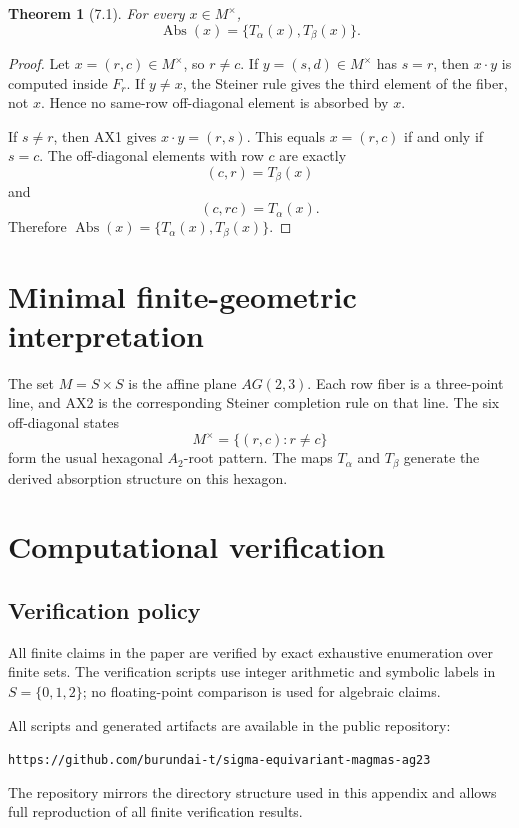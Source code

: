 \documentclass[11pt]{article}
\newtheorem*{theoremstar}{Theorem}
\begin{document}
\begin{theoremstar}[7.1]
For every \(x\in M^\times\),
\[
\operatorname{Abs}(x)=\{T_\alpha(x),T_\beta(x)\}.
\]

\end{theoremstar}
\begin{proof}
Let \(x=(r,c)\in M^\times\), so \(r\ne c\). If \(y=(s,d)\in M^\times\)
has \(s=r\), then \(x\cdot y\) is computed inside \(F_r\). If \(y\ne x\), the
Steiner rule gives the third element of the fiber, not \(x\). Hence no same-row
off-diagonal element is absorbed by \(x\).

If \(s\ne r\), then AX1 gives \(x\cdot y=(r,s)\). This equals \(x=(r,c)\) if and
only if \(s=c\). The off-diagonal elements with row \(c\) are exactly
\[
(c,r)=T_\beta(x)
\]
and
\[
(c,rc)=T_\alpha(x).
\]
Therefore \(\operatorname{Abs}(x)=\{T_\alpha(x),T_\beta(x)\}\).

\end{proof}


\section{Minimal finite-geometric interpretation}

The set \(M=S\times S\) is the affine plane \(AG(2,3)\). Each row fiber is a
three-point line, and AX2 is the corresponding Steiner completion rule on that
line. The six off-diagonal states
\[
M^\times=\{(r,c):r\ne c\}
\]
form the usual hexagonal \(A_2\)-root pattern. The maps \(T_\alpha\) and
\(T_\beta\) generate the derived absorption structure on this hexagon.

\appendix
\section{Computational verification}

\subsection{Verification policy}

All finite claims in the paper are verified by exact exhaustive enumeration over
finite sets. The verification scripts use integer arithmetic and symbolic labels
in \(S=\{0,1,2\}\); no floating-point comparison is used for algebraic claims.

All scripts and generated artifacts are available in the public repository:
\begin{center}
\texttt{https://github.com/burundai-t/sigma-equivariant-magmas-ag23}
\end{center}
The repository mirrors the directory structure used in this appendix and allows full reproduction of all finite verification results.
\end{document}
